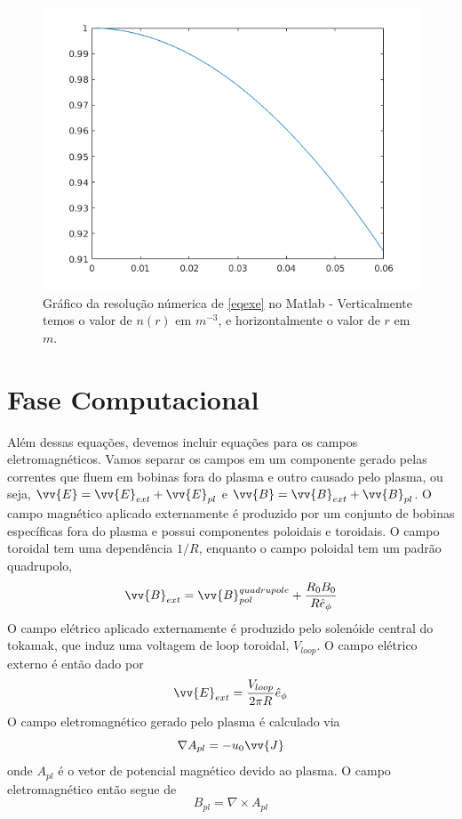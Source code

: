 \documentclass[12pt,oneside,a4paper]{abntex2}
\begin{document}
\begin{figure}[H]
\centering
\includegraphics[scale=0.5]{exeplo2.png} 
\caption{Gráfico da resolução númerica de \ref{eqexe} no Matlab - Verticalmente temos o valor de $n(r)$ em $m^{-3}$, e horizontalmente o valor de $r$ em $m$.}
\end{figure}

\chapter{Fase Computacional}

Além dessas equações, devemos incluir equações para os campos eletromagnéticos. Vamos separar os campos em um componente gerado pelas correntes que fluem em bobinas fora do plasma e outro causado pelo plasma, ou seja, $\vv{E} = \vv{E}_{ext} + \vv{E}_{pl}$ e $\vv{B} = \vv{B}_{ext} + \vv{B}_{pl}$. O campo magnético aplicado externamente é produzido por um conjunto de bobinas específicas fora do plasma e possui componentes poloidais e toroidais. O campo toroidal tem uma dependência $1 / R$, enquanto o campo poloidal tem um padrão quadrupolo,
\begin{equation}
\vv{B}_{ext}=\vv{B}_{pol}^{quadrupole}+\frac{R_0B_0}{R\hat{e}_{\phi}}
\end{equation}
O campo elétrico aplicado externamente é produzido pelo solenóide central do tokamak, que induz uma voltagem de loop toroidal, $V_{loop}$. O campo elétrico externo é então dado por
\begin{equation}
\vv{E}_{ext} = \frac{V_{loop}}{2\pi R} \hat{e}_{\phi}
\end{equation}
O campo eletromagnético gerado pelo plasma é calculado via
\begin{equation}
\nabla A_{pl}=-u_0\vv{J}
\end{equation}
onde $A_{pl}$ é o vetor de potencial magnético devido ao plasma. O campo eletromagnético então segue de
\begin{equation}
B_{pl} = \nabla \times A_{pl}
\end{equation}
\end{document}
